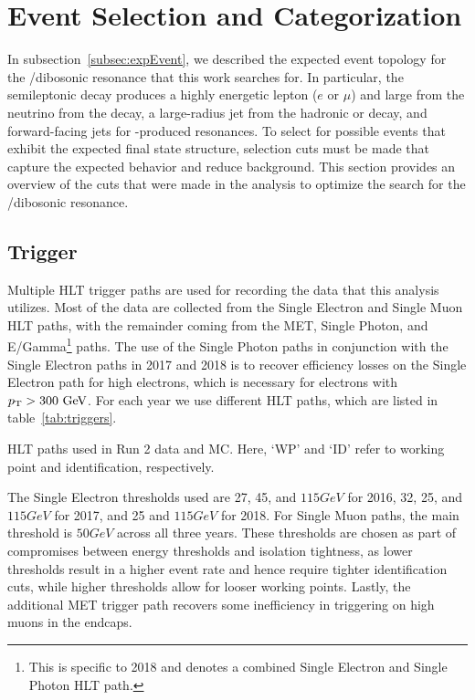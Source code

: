 
\section{Event Selection and Categorization}
\label{sec:events}

In subsection~\ref{subsec:expEvent}, we described the expected event topology for the \WV/\WH dibosonic resonance that this work searches for.
In particular, the semileptonic decay produces a highly energetic lepton ($e$ or $\mu$) and large \ptmiss from the neutrino from the \Wtolnu decay, a large-radius jet from the hadronic \Vtoqqbarpr or \Htobbbar decay, and forward-facing \VBF jets for \VBF-produced resonances.
To select for possible events that exhibit the expected final state structure, selection cuts must be made that capture the expected behavior and reduce background.
This section provides an overview of the cuts that were made in the analysis to optimize the search for the \WV/\WH dibosonic resonance.

\subsection{Trigger}

Multiple HLT trigger paths are used for recording the data that this analysis utilizes.
Most of the data are collected from the Single Electron and Single Muon HLT paths, with the remainder coming from the MET, Single Photon, and E/Gamma\footnote{This is specific to 2018 and denotes a combined Single Electron and Single Photon HLT path.} paths.
The use of the Single Photon paths in conjunction with the Single Electron paths in 2017 and 2018 is to recover efficiency losses on the Single Electron path for high \pt electrons, which is necessary for electrons with $\pt>300\unit{GeV}$.
For each year we use different HLT paths, which are listed in table~\ref{tab:triggers}.

\begin{table}[htbp]
  \centering
  
  \caption{
    HLT paths used in Run 2 data and MC.
    Here, `WP' and `ID' refer to working point and identification, respectively.
  }
  \label{tab:triggers}
\end{table}

The Single Electron \pt thresholds used are 27, 45, and $115\unit{GeV}$ for 2016, 32, 25, and $115\unit{GeV}$ for 2017, and 25 and $115\unit{GeV}$ for 2018.
For Single Muon paths, the main threshold is $50\unit{GeV}$ across all three years.
These thresholds are chosen as part of compromises between energy thresholds and isolation tightness, as lower \pt thresholds result in a higher event rate and hence require tighter identification cuts, while higher \pt thresholds allow for looser working points.
Lastly, the additional MET trigger path recovers some inefficiency in triggering on high \pt muons in the endcaps.

